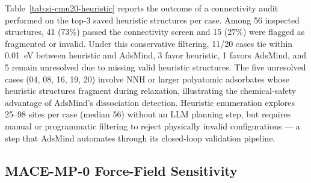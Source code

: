 \documentclass[%
 preprint,
 superscriptaddress,
 amsmath,amssymb,
 aps,
 prb,
 floatfix,
]{revtex4-2}
\begin{document}
Table~\ref{tab:si-cmu20-heuristic} reports the outcome of a connectivity audit performed on the top-3 saved heuristic structures per case. Among 56 inspected structures, 41 (73\%) passed the connectivity screen and 15 (27\%) were flagged as fragmented or invalid. Under this conservative filtering, 11/20 cases tie within 0.01~eV between heuristic and AdsMind, 3 favor heuristic, 1 favors AdsMind, and 5 remain unresolved due to missing valid heuristic structures. The five unresolved cases (04, 08, 16, 19, 20) involve NNH or larger polyatomic adsorbates whose heuristic structures fragment during relaxation, illustrating the chemical-safety advantage of AdsMind's dissociation detection. Heuristic enumeration explores 25--98 sites per case (median 56) without an LLM planning step, but requires manual or programmatic filtering to reject physically invalid configurations --- a step that AdsMind automates through its closed-loop validation pipeline.

\subsection{MACE-MP-0 Force-Field Sensitivity}
\end{document}
